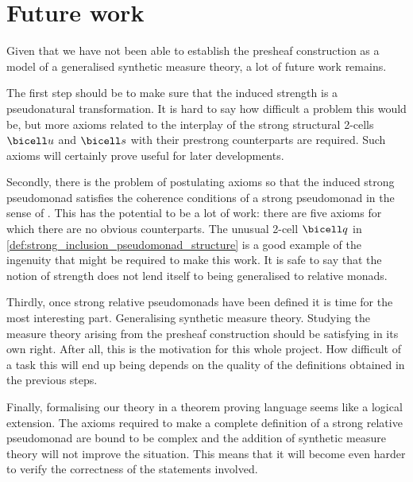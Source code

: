 \chapter{Future work}

Given that we have not been able to establish the presheaf construction as a
model of a generalised synthetic measure theory, a lot of future work remains.

The first step should be to make sure that the induced strength is a
pseudonatural transformation. It is hard to say how difficult a problem this
would be, but more axioms related to the interplay of the strong structural
2-cells $\bicell u$ and $\bicell s$ with their prestrong counterparts are
required. Such axioms will certainly prove useful for later developments.

Secondly, there is the problem of postulating axioms so that the induced strong
pseudomonad satisfies the coherence conditions of a strong pseudomonad in the
sense of \cite{saville2023}. This has the potential to be a lot of work: there
are five axioms for which there are no obvious counterparts. The unusual 2-cell
$\bicell q$ in \ref{def:strong_inclusion_pseudomonad_structure} is a good
example of the ingenuity that might be required to make this work. It is
safe to say that the notion of strength does not lend itself to being
generalised to relative monads.

Thirdly, once strong relative pseudomonads have been defined it is time for the
most interesting part. Generalising synthetic measure theory. Studying the
measure theory arising from the presheaf construction should be satisfying in
its own right. After all, this is the motivation for this whole project. How
difficult of a task this will end up being depends on the quality of the
definitions obtained in the previous steps.

Finally, formalising our theory in a theorem proving language seems like a
logical extension. The axioms required to make a complete definition of a strong
relative pseudomonad are bound to be complex and the addition of synthetic
measure theory will not improve the situation. This means that it will become
even harder to verify the correctness of the statements involved.
